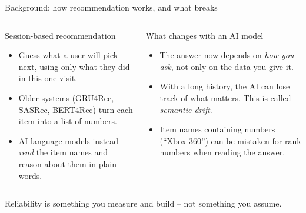 \documentclass[aspectratio=169,12pt]{beamer}
\begin{document}
\begin{frame}{Background: how recommendation works, and what breaks}
\begin{columns}[T]
\begin{block}{Session-based recommendation}
\begin{itemize}
  \item Guess what a user will pick next, using only what they did in this
        one visit.
  \item Older systems (GRU4Rec, SASRec, BERT4Rec) turn each item into a
        list of numbers.
  \item AI language models instead \emph{read} the item names and reason
        about them in plain words.
\end{itemize}
\end{block}

\begin{alertblock}{What changes with an AI model}
\begin{itemize}
  \item The answer now depends on \emph{how you ask}, not only on the data
        you give it.
  \item With a long history, the AI can lose track of what matters. This is
        called \emph{semantic drift}.
  \item Item names containing numbers (``Xbox 360'') can be mistaken for
        rank numbers when reading the answer.
\end{itemize}
\end{alertblock}
\end{columns}

\vspace{0.6em}
\centering
\Large\textcolor{DeepBlue}{Reliability is something you measure and build -- not something you assume.}
\end{frame}
\end{document}
